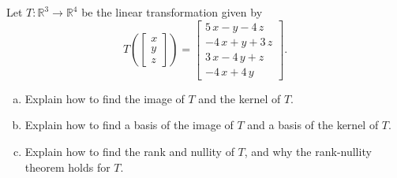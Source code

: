 
\begin{exerciseStatement}
 Let \(T:\mathbb{R}^ 3  \to \mathbb{R}^ 4 \) be the linear transformation given by \[T\left(  \left[\begin{array}{c}
x \\
y \\
z
\end{array}\right]  \right) =  \left[\begin{array}{c}
5 \, x - y - 4 \, z \\
-4 \, x + y + 3 \, z \\
3 \, x - 4 \, y + z \\
-4 \, x + 4 \, y
\end{array}\right] .\]
\begin{enumerate}[(a)]
\item Explain how to find the image of \(T\) and the kernel of \(T\).
\item Explain how to find a basis of the image of \(T\) and a basis of the kernel of \(T\).
\item Explain how to find the rank and nullity of \(T\), and why the rank-nullity theorem holds for \(T\).
\end{enumerate}
    
\end{exerciseStatement}
    
